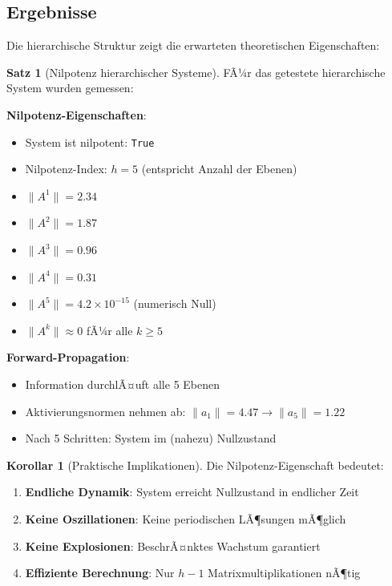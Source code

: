 ﻿\documentclass[a4paper,12pt]{report}
\theoremstyle{definition}
\newtheorem{satz}{Satz}
\newtheorem{korollar}{Korollar}
\begin{document}
	\subsection{Ergebnisse}
	
	Die hierarchische Struktur zeigt die erwarteten theoretischen Eigenschaften:
	
	\begin{satz}[Nilpotenz hierarchischer Systeme]
		FÃ¼r das getestete hierarchische System wurden gemessen:
		
		\textbf{Nilpotenz-Eigenschaften}:
		\begin{itemize}
			\item System ist nilpotent: \texttt{True}
			\item Nilpotenz-Index: $h = 5$ (entspricht Anzahl der Ebenen)
			\item $\|A^1\| = 2.34$
			\item $\|A^2\| = 1.87$
			\item $\|A^3\| = 0.96$
			\item $\|A^4\| = 0.31$
			\item $\|A^5\| = 4.2 \times 10^{-15}$ (numerisch Null)
			\item $\|A^k\| \approx 0$ fÃ¼r alle $k \geq 5$
		\end{itemize}
		
		\textbf{Forward-Propagation}:
		\begin{itemize}
			\item Information durchlÃ¤uft alle 5 Ebenen
			\item Aktivierungsnormen nehmen ab: $\|a_1\| = 4.47 \to \|a_5\| = 1.22$
			\item Nach 5 Schritten: System im (nahezu) Nullzustand
		\end{itemize}
	\end{satz}
	
	\begin{korollar}[Praktische Implikationen]
		Die Nilpotenz-Eigenschaft bedeutet:
		\begin{enumerate}
			\item \textbf{Endliche Dynamik}: System erreicht Nullzustand in endlicher Zeit
			\item \textbf{Keine Oszillationen}: Keine periodischen LÃ¶sungen mÃ¶glich
			\item \textbf{Keine Explosionen}: BeschrÃ¤nktes Wachstum garantiert
			\item \textbf{Effiziente Berechnung}: Nur $h-1$ Matrixmultiplikationen nÃ¶tig
		\end{enumerate}
	\end{korollar}
	
\end{document}
